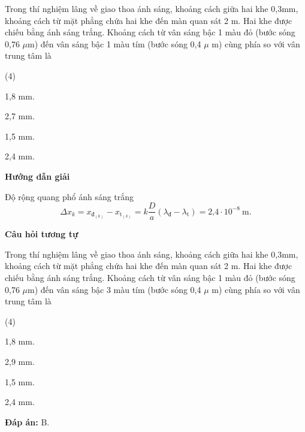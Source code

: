 {
Trong thí nghiệm lâng về giao thoa ánh sáng, khoảng cách giữa hai khe 0,3mm, khoảng cách từ mặt phẳng chứa hai khe đến màn quan sát 2 m. Hai khe được chiếu bằng ánh sáng trắng. Khoảng cách từ vân sáng bậc 1 màu đỏ (bước sóng 0,76 $\mu$m) đến vân sáng bậc 1 màu tím (bước sóng 0,4 $\mu$ m) cùng phía so với vân trung tâm là
\begin{mcq}(4)
\item 1,8 mm.			
\item 2,7 mm.			
\item 1,5 mm.			
\item 2,4 mm.
\end{mcq}}
{\begin{center}
	\textbf{Hướng dẫn giải}
\end{center}


Độ rộng quang phổ ánh sáng trắng
\begin{equation*}
	\Delta x_{k} = x_{\text{đ}_(k)}-x_{\text{t}_(k)}=k\dfrac{D}{a}(\lambda_\text{đ}-\lambda_\text{t})=\text{2,4} \cdot 10^{-8}\ \text{m}.
\end{equation*}

\begin{center}
	\textbf{Câu hỏi tương tự}
\end{center}

Trong thí nghiệm lâng về giao thoa ánh sáng, khoảng cách giữa hai khe 0,3mm, khoảng cách từ mặt phẳng chứa hai khe đến màn quan sát 2 m. Hai khe được chiếu bằng ánh sáng trắng. Khoảng cách từ vân sáng bậc 1 màu đỏ (bước sóng 0,76 $\mu$m) đến vân sáng bậc 3 màu tím (bước sóng 0,4 $\mu$ m) cùng phía so với vân trung tâm là
\begin{mcq}(4)
\item 1,8 mm.			
\item 2,9 mm.			
\item 1,5 mm.			
\item 2,4 mm.
\end{mcq}

\textbf{Đáp án:} B.
}

